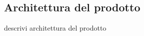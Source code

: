 \documentclass[../manuale-manutentore.tex]{subfiles}
\begin{document}
\subsection{Architettura del prodotto}%
\label{sub:architettura_del_prodotto}

descrivi architettura del prodotto






\end{document}
